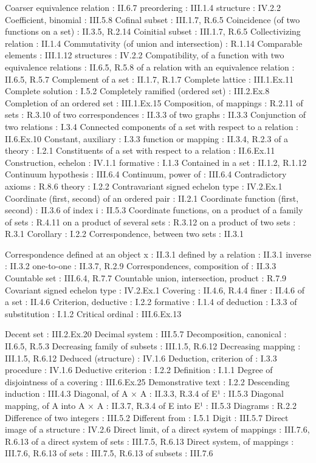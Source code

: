 Coarser equivalence relation : II.6.7 preordering : III.1.4 structure : IV.2.2 Coefficient, binomial : III.5.8 Cofinal subset : III.1.7, R.6.5 Coincidence (of two functions on a set) : II.3.5, R.2.14 Coinitial subset : III.1.7, R.6.5 Collectivizing relation : II.1.4 Commutativity (of union and intersection) : R.1.14 Comparable elements : III.1.12 structures : IV.2.2 Compatibility, of a function with two equivalence relations : II.6.5, R.5.8 of a relation with an equivalence relation : II.6.5, R.5.7 Complement of a set : II.1.7, R.1.7 Complete lattice : III.1.Ex.11 Complete solution : I.5.2 Completely ramified (ordered set) : III.2.Ex.8 Completion of an ordered set : III.1.Ex.15 Composition, of mappings : R.2.11 of sets : R.3.10 of two correspondences : II.3.3 of two graphs : II.3.3 Conjunction of two relations : I.3.4 Connected components of a set with respect to a relation : II.6.Ex.10 Constant, auxiliary : I.3.3 function or mapping : II.3.4, R.2.3 of a theory : I.2.1 Constituents of a set with respect to a relation : II.6.Ex.11 Construction, echelon : IV.1.1 formative : I.1.3 Contained in a set : II.1.2, R.1.12 Continuum hypothesis : III.6.4 Continuum, power of : III.6.4 Contradictory axioms : R.8.6 theory : I.2.2 Contravariant signed echelon type : IV.2.Ex.1 Coordinate (first, second) of an ordered pair : II.2.1 Coordinate function (first, second) : II.3.6 of index i : II.5.3 Coordinate functions, on a product of a family of sets : R.4.11 on a product of several sets : R.3.12 on a product of two sets : R.3.1 Corollary : I.2.2 Correspondence, between two sets : II.3.1

Correspondence defined at an object x : II.3.1 defined by a relation : II.3.1 inverse : II.3.2 one-to-one : II.3.7, R.2.9 Correspondences, composition of : II.3.3 Countable set : III.6.4, R.7.7 Countable union, intersection, product : R.7.9 Covariant signed echelon type : IV.2.Ex.1 Covering : II.4.6, R.4.4 finer : II.4.6 of a set : II.4.6 Criterion, deductive : I.2.2 formative : I.1.4 of deduction : I.3.3 of substitution : I.1.2 Critical ordinal : III.6.Ex.13

Decent set : III.2.Ex.20 Decimal system : III.5.7 Decomposition, canonical : II.6.5, R.5.3 Decreasing family of subsets : III.1.5, R.6.12 Decreasing mapping : III.1.5, R.6.12 Deduced (structure) : IV.1.6 Deduction, criterion of : I.3.3 procedure : IV.1.6 Deductive criterion : I.2.2 Definition : I.1.1 Degree of disjointness of a covering : III.6.Ex.25 Demonstrative text : I.2.2 Descending induction : III.4.3 Diagonal, of A × A : II.3.3, R.3.4 of E¹ : II.5.3 Diagonal mapping, of A into A × A : II.3.7, R.3.4 of E into E¹ : II.5.3 Diagrams : R.2.2 Difference of two integers : III.5.2 Different from : I.5.1 Digit : III.5.7 Direct image of a structure : IV.2.6 Direct limit, of a direct system of mappings : III.7.6, R.6.13 of a direct system of sets : III.7.5, R.6.13 Direct system, of mappings : III.7.6, R.6.13 of sets : III.7.5, R.6.13 of subsets : III.7.6

